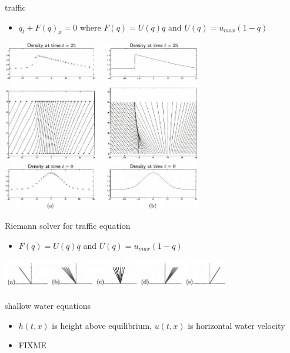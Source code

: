 \documentclass[10pt,hyperref,dvipsnames]{beamer}
\begin{document}
\begin{frame}{traffic}

\begin{itemize}
\item $q_t + F(q)_x = 0$ where $F(q) = U(q) q$ and $U(q) = u_{max} (1-q)$
\end{itemize}

\hfill \includegraphics[width=0.65\textwidth]{figs/leveque11p1}
\end{frame}

\begin{frame}{Riemann solver for traffic equation}

\begin{itemize}
\item $F(q) = U(q) q$ and $U(q) = u_{max} (1-q)$
\end{itemize}

\hfill \includegraphics[width=0.75\textwidth]{figs/leveque12p1}
\end{frame}


\begin{frame}{shallow water equations}

\begin{itemize}
\item $h(t,x)$ is height above equilibrium, $u(t,x)$ is horizontal water velocity
\item FIXME
\end{itemize}
\end{frame}
\end{document}
